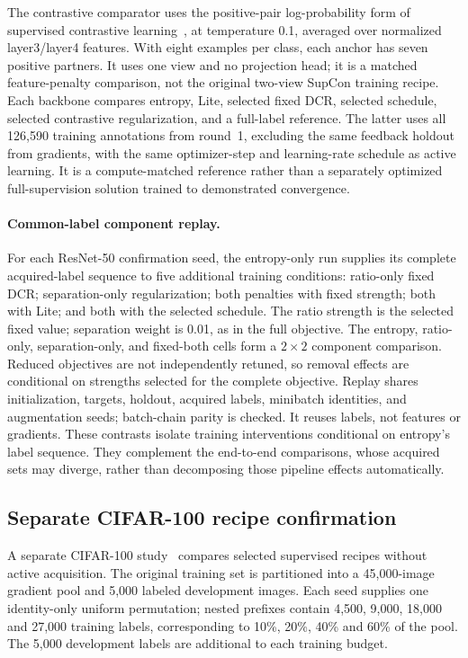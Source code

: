\documentclass[10pt,a4paper,twocolumn]{article}
\begin{document}
The contrastive comparator uses the positive-pair log-probability form
of supervised contrastive learning~\cite{khosla2020supervised}, at
temperature 0.1, averaged over normalized layer3/layer4 features. With
eight examples per class, each anchor has seven positive partners.
It uses one view and no projection head; it is a matched feature-penalty
comparison, not the original two-view SupCon training recipe.
Each backbone compares entropy, Lite, selected fixed DCR, selected
schedule, selected contrastive regularization, and a full-label reference.
The latter uses all 126,590 training annotations from round~1, excluding
the same feedback holdout from gradients, with the same optimizer-step
and learning-rate schedule as active learning. It is a compute-matched
reference rather than a separately optimized full-supervision solution
trained to demonstrated convergence.

\paragraph{Common-label component replay.}
For each ResNet-50 confirmation seed, the entropy-only run supplies its
complete acquired-label sequence to five additional training conditions:
ratio-only fixed DCR; separation-only regularization; both penalties
with fixed strength; both with Lite; and both with the selected schedule.
The ratio strength is the selected fixed value; separation weight is
0.01, as in the full objective. The entropy, ratio-only, separation-only,
and fixed-both cells form a $2\times2$ component comparison. Reduced
objectives are not independently retuned, so removal effects are
conditional on strengths selected for the complete objective.
Replay shares initialization, targets, holdout, acquired labels,
minibatch identities, and augmentation seeds; batch-chain parity is
checked. It reuses labels, not features or gradients. These contrasts
isolate training interventions conditional on entropy's label sequence.
They complement the end-to-end comparisons, whose acquired sets may
diverge, rather than decomposing those pipeline effects automatically.

\subsection{Separate CIFAR-100 recipe confirmation}
\label{sec:cifar100_design}

A separate CIFAR-100 study~\cite{krizhevsky2009cifar} compares selected
supervised recipes without active acquisition. The original training set
is partitioned into a 45,000-image gradient pool and 5,000 labeled
development images. Each seed supplies one identity-only uniform
permutation; nested prefixes contain 4,500, 9,000, 18,000 and 27,000
training labels, corresponding to 10\%, 20\%, 40\% and 60\% of the pool.
The 5,000 development labels are additional to each training budget.
\end{document}
